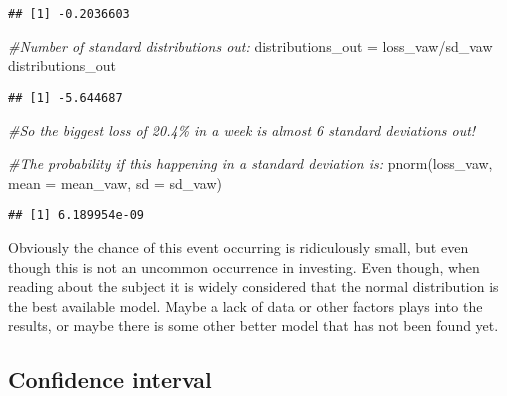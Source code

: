 \documentclass[
]{article}
\newenvironment{Shaded}{\begin{snugshade}}{\end{snugshade}}
\newcommand{\AttributeTok}[1]{\textcolor[rgb]{0.77,0.63,0.00}{#1}}
\newcommand{\CommentTok}[1]{\textcolor[rgb]{0.56,0.35,0.01}{\textit{#1}}}
\newcommand{\FunctionTok}[1]{\textcolor[rgb]{0.00,0.00,0.00}{#1}}
\newcommand{\NormalTok}[1]{#1}
\newcommand{\OtherTok}[1]{\textcolor[rgb]{0.56,0.35,0.01}{#1}}
\newcommand{\SpecialCharTok}[1]{\textcolor[rgb]{0.00,0.00,0.00}{#1}}
\begin{document}
\begin{Shaded}
\end{Shaded}

\begin{verbatim}
## [1] -0.2036603
\end{verbatim}

\begin{Shaded}
\begin{Highlighting}[]
\CommentTok{\#Number of standard distributions out:}
\NormalTok{distributions\_out }\OtherTok{=}\NormalTok{ loss\_vaw}\SpecialCharTok{/}\NormalTok{sd\_vaw}
\NormalTok{distributions\_out}
\end{Highlighting}
\end{Shaded}

\begin{verbatim}
## [1] -5.644687
\end{verbatim}

\begin{Shaded}
\begin{Highlighting}[]
\CommentTok{\#So the biggest loss of 20.4\% in a week is almost 6 standard deviations out!}

\CommentTok{\#The probability if this happening in a standard deviation is:}
\FunctionTok{pnorm}\NormalTok{(loss\_vaw, }\AttributeTok{mean =}\NormalTok{ mean\_vaw, }\AttributeTok{sd =}\NormalTok{ sd\_vaw)}
\end{Highlighting}
\end{Shaded}

\begin{verbatim}
## [1] 6.189954e-09
\end{verbatim}

Obviously the chance of this event occurring is ridiculously small, but
even though this is not an uncommon occurrence in investing. Even
though, when reading about the subject it is widely considered that the
normal distribution is the best available model. Maybe a lack of data or
other factors plays into the results, or maybe there is some other
better model that has not been found yet.

\subsection{Confidence interval}
\end{document}
